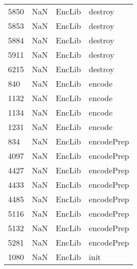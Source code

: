 \begin{tabular}{llll}
5850 &                   NaN &                     EncLib &                                   destroy \\
5853 &                   NaN &                     EncLib &                                   destroy \\
5884 &                   NaN &                     EncLib &                                   destroy \\
5911 &                   NaN &                     EncLib &                                   destroy \\
6215 &                   NaN &                     EncLib &                                   destroy \\
840  &                   NaN &                     EncLib &                                    encode \\
1132 &                   NaN &                     EncLib &                                    encode \\
1134 &                   NaN &                     EncLib &                                    encode \\
1231 &                   NaN &                     EncLib &                                    encode \\
834  &                   NaN &                     EncLib &                                encodePrep \\
4097 &                   NaN &                     EncLib &                                encodePrep \\
4427 &                   NaN &                     EncLib &                                encodePrep \\
4433 &                   NaN &                     EncLib &                                encodePrep \\
4485 &                   NaN &                     EncLib &                                encodePrep \\
5116 &                   NaN &                     EncLib &                                encodePrep \\
5132 &                   NaN &                     EncLib &                                encodePrep \\
5281 &                   NaN &                     EncLib &                                encodePrep \\
1080 &                   NaN &                     EncLib &                                      init \\

\end{tabular}
